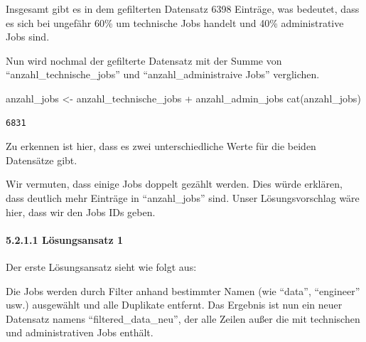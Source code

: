 \documentclass[
  letterpaper,
  DIV=11,
  numbers=noendperiod]{scrartcl}
\let\oldparagraph\paragraph
\renewcommand{\paragraph}[1]{\oldparagraph{#1}\mbox{}}
\newenvironment{Shaded}{\begin{snugshade}}{\end{snugshade}}
\newcommand{\FunctionTok}[1]{\textcolor[rgb]{0.28,0.35,0.67}{#1}}
\newcommand{\NormalTok}[1]{\textcolor[rgb]{0.00,0.23,0.31}{#1}}
\newcommand{\OtherTok}[1]{\textcolor[rgb]{0.00,0.23,0.31}{#1}}
\newcommand{\SpecialCharTok}[1]{\textcolor[rgb]{0.37,0.37,0.37}{#1}}
\begin{document}
Insgesamt gibt es in dem gefilterten Datensatz 6398 Einträge, was
bedeutet, dass es sich bei ungefähr 60\% um technische Jobs handelt und
40\% administrative Jobs sind.

Nun wird nochmal der gefilterte Datensatz mit der Summe von
``anzahl\_technische\_jobs'' und ``anzahl\_administraive Jobs''
verglichen.

\begin{Shaded}
\begin{Highlighting}[]
\NormalTok{anzahl\_jobs }\OtherTok{\textless{}{-}}\NormalTok{ anzahl\_technische\_jobs }\SpecialCharTok{+}\NormalTok{ anzahl\_admin\_jobs}
\FunctionTok{cat}\NormalTok{(anzahl\_jobs)}
\end{Highlighting}
\end{Shaded}

\begin{verbatim}
6831
\end{verbatim}

Zu erkennen ist hier, dass es zwei unterschiedliche Werte für die beiden
Datensätze gibt.

Wir vermuten, dass einige Jobs doppelt gezählt werden. Dies würde
erklären, dass deutlich mehr Einträge in ``anzahl\_jobs'' sind. Unser
Lösungsvorschlag wäre hier, dass wir den Jobs IDs geben.

\hypertarget{luxf6sungsansatz-1}{%
\paragraph{5.2.1.1 Lösungsansatz 1}\label{luxf6sungsansatz-1}}

Der erste Lösungsansatz sieht wie folgt aus:

Die Jobs werden durch Filter anhand bestimmter Namen (wie ``data'',
``engineer'' usw.) ausgewählt und alle Duplikate entfernt. Das Ergebnis
ist nun ein neuer Datensatz namens ``filtered\_data\_neu'', der alle
Zeilen außer die mit technischen und administrativen Jobs enthält.
\end{document}
